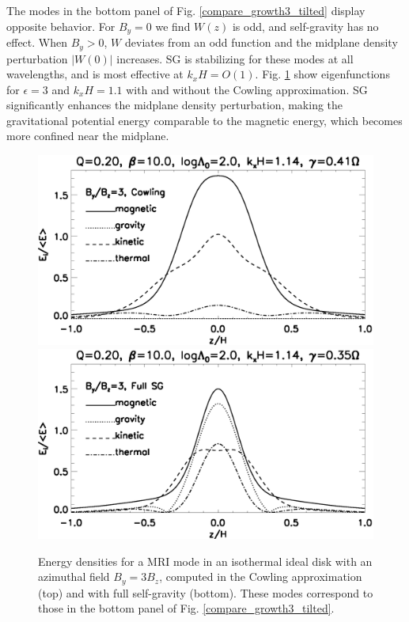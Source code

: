 The modes in the bottom panel of Fig. \ref{compare_growth3_tilted} 
display opposite behavior. For $B_y=0$ we find $W(z)$ is odd, and
self-gravity has no effect. When $B_y>0$, $W$ deviates from an
odd function and the midplane density perturbation $|W(0)|$
increases. SG is stabilizing for these modes at all wavelengths, and
is most effective at $k_xH =  O(1)$. 
Fig. \ref{result_tilted} show eigenfunctions for $\epsilon=3$ and
$k_xH=1.1$ with and without the Cowling approximation.
SG significantly enhances the midplane density perturbation, making the
gravitational potential energy comparable to the magnetic energy, 
which becomes more confined near the midplane.  

\begin{figure}
  \includegraphics[width=\linewidth,clip=true,trim=0cm 1.5cm 0cm
    0cm]{figures/result_tilted_cowling.ps}  
  \includegraphics[width=\linewidth,clip=true,trim=0cm 0cm 0cm
    0.cm]{figures/result_tilted_fullsg.ps} 
  \caption{Energy densities for a MRI mode in an isothermal ideal disk
    with an azimuthal field $B_y = 3B_z$, computed in the Cowling
    approximation (top) and with full self-gravity (bottom). These
    modes correspond to those in the bottom panel of
    Fig. \ref{compare_growth3_tilted}.    
    \label{result_tilted}}
\end{figure}


